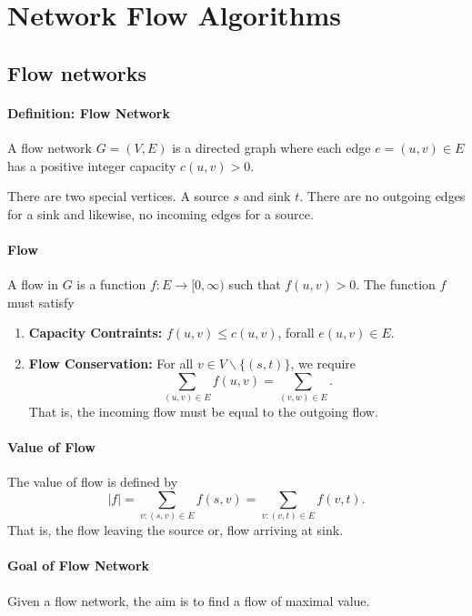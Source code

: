 \section{Network Flow Algorithms}

\subsection{Flow networks}

\paragraph{Definition: Flow Network}
A flow network \( G = (V, E) \) is a directed graph where each edge
\( e = (u, v) \in  E \) has a positive integer capacity
\( c(u, v) > 0 \).

There are two special vertices. A source \( s \) and sink  \( t \).
There are no outgoing edges for a sink and likewise, no incoming edges
for a source.

\paragraph{Flow}
A flow in \( G \) is a function  \( f: E \to  [0, \infty) \) such that
\(  f(u, v) > 0 \). The function \( f \) must satisfy
\begin{enumerate}
  \item \textbf{Capacity Contraints:} \( f(u, v) \leq c(u, v)\), forall
     \( e(u, v) \in  E \).
  \item \textbf{Flow Conservation:} For all \( v \in V \backslash \{(s, t)\} \),
    we require \[
        \sum_{(u, v) \in  E} f(u, v) = \sum_{(v, w) \in  E}
    .\]
    That is, the incoming flow must be equal to the outgoing flow.
\end{enumerate}

\paragraph{Value of Flow}
The value of flow is defined by \[
  |f| = \sum_{v: (s, v) \in E} f(s, v)
  =
  \sum_{v: (v, t) \in  E} f(v, t)
.\]
That is, the flow leaving the source or, flow arriving at sink.

\paragraph{Goal of Flow Network}
Given a flow network, the aim is to find a flow of maximal value.

